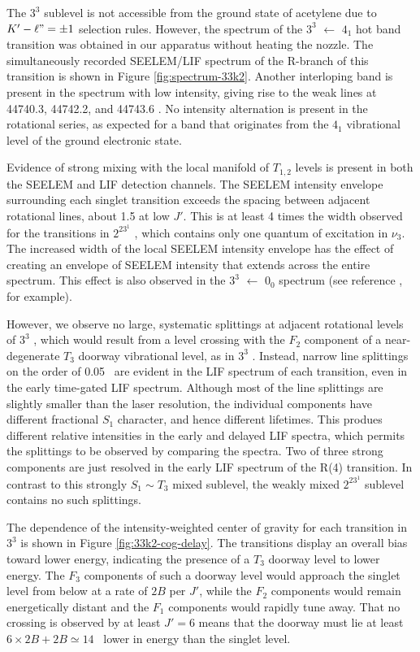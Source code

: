 \documentclass[12pt]{mitthesis}
\begin{document}
The $3^3$  sublevel is not accessible from the ground state of
acetylene due to $K' - \ell" = \pm 1$ selection rules.  However, the
spectrum of the $3^3$  $\leftarrow$ $4_1$ hot band transition
was obtained in our apparatus without heating the nozzle.  The
simultaneously recorded SEELEM/LIF spectrum of the R-branch of this
transition is shown in Figure \ref{fig:spectrum-33k2}.  Another
interloping band is present in the spectrum with low intensity,
giving rise to the weak lines at 44740.3, 44742.2, and 44743.6 \rcm.
No intensity alternation is present in the rotational series, as
expected for a band that originates from the $4_1$ vibrational level
of the ground electronic state.

Evidence of strong mixing with the local manifold of $T_{1,2}$ levels
is present in both the SEELEM and LIF detection channels.  The SEELEM
intensity envelope surrounding each singlet transition exceeds the
spacing between adjacent rotational lines, about 1.5 \rcm at low $J'$.
This is at least 4 times the width observed for the transitions in
$2^23^1$ , which contains only one quantum of excitation in
$\nu_3$.  The increased width of the local SEELEM intensity envelope
has the effect of creating an envelope of SEELEM intensity that
extends across the entire spectrum.  This effect is also observed in
the $3^3$  $\leftarrow$ $0_0$ spectrum (see reference
\cite{humphrey97}, for example).  

However, we observe no large, systematic splittings at adjacent
rotational levels of $3^3$ , which would result from a level
crossing with the $F_2$ component of a near-degenerate $T_3$ doorway
vibrational level, as in $3^3$  \cite{mishra04}.  Instead,
narrow line splittings on the order of 0.05 \rcm\ are evident in the
LIF spectrum of each transition, even in the early time-gated LIF
spectrum.  Although most of the line splittings are slightly smaller
than the laser resolution, the individual components have different
fractional $S_1$ character, and hence different lifetimes.  This
produes different relative intensities in the early and delayed LIF
spectra, which permits the splittings to be observed by comparing the
spectra.  Two of three strong components are just resolved in the
early LIF spectrum of the R(4) transition.  In contrast to this
strongly $S_1 \sim T_3$ mixed sublevel, the weakly mixed $2^23^1$
 sublevel contains no such splittings.

The dependence of the intensity-weighted center of gravity for each
transition in $3^3$  is shown in Figure
\ref{fig:33k2-cog-delay}.  The transitions display an overall bias
toward lower energy, indicating the presence of a $T_3$ doorway level
to lower energy.  The $F_3$ components of such a doorway level would
approach the singlet level from below at a rate of $2B$ per $J'$,
while the $F_2$ components would remain energetically distant and the
$F_1$ components would rapidly tune away.  That no crossing is
observed by at least $J'=6$ means that the doorway must lie at least
$6\times2B + 2B \simeq 14$ \rcm\ lower in energy than the singlet
level.
\end{document}
